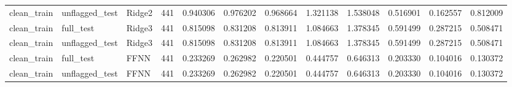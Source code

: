 \begin{tabular}{lllrrrrrrrrr}
clean_train & unflagged_test & Ridge2 & 441 & 0.940306 & 0.976202 & 0.968664 & 1.321138 & 1.538048 & 0.516901 & 0.162557 & 0.812009 \\
clean_train & full_test & Ridge3 & 441 & 0.815098 & 0.831208 & 0.813911 & 1.084663 & 1.378345 & 0.591499 & 0.287215 & 0.508471 \\
clean_train & unflagged_test & Ridge3 & 441 & 0.815098 & 0.831208 & 0.813911 & 1.084663 & 1.378345 & 0.591499 & 0.287215 & 0.508471 \\
clean_train & full_test & FFNN & 441 & 0.233269 & 0.262982 & 0.220501 & 0.444757 & 0.646313 & 0.203330 & 0.104016 & 0.130372 \\
clean_train & unflagged_test & FFNN & 441 & 0.233269 & 0.262982 & 0.220501 & 0.444757 & 0.646313 & 0.203330 & 0.104016 & 0.130372 \\
\bottomrule
\end{tabular}
